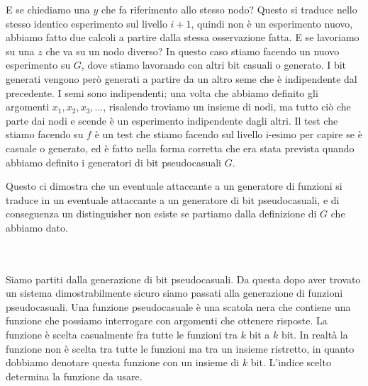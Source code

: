 E se chiediamo una $y$ che fa riferimento allo stesso nodo? Questo si traduce nello stesso identico esperimento sul livello $i+1$, quindi non è un esperimento nuovo, abbiamo fatto due calcoli a partire dalla stessa osservazione fatta. E se lavoriamo su una $z$ che va su un nodo diverso? In questo caso stiamo facendo un nuovo esperimento su $G$, dove stiamo lavorando con altri bit casuali o generato. I bit generati vengono però generati a partire da un altro seme che è indipendente dal precedente. I semi sono indipendenti; una volta che abbiamo definito gli argomenti $x_1, x_2, x_3, ...$, risalendo troviamo un insieme di nodi, ma tutto ciò che parte dai nodi e scende è un esperimento indipendente dagli altri. Il test che stiamo facendo su $f$ è un test che stiamo facendo sul livello i-esimo per capire se è casuale o generato, ed è fatto nella forma corretta che era stata prevista quando abbiamo definito i generatori di bit pseudocasuali $G$. 

Questo ci dimostra che un eventuale attaccante a un generatore di funzioni si traduce in un eventuale attaccante a un generatore di bit pseudocasuali, e di conseguenza un distinguisher non esiste se partiamo dalla definizione di $G$ che abbiamo dato.

\noindent{}

\\\\



Siamo partiti dalla generazione di bit pseudocasuali. Da questa dopo aver trovato un sistema dimostrabilmente sicuro siamo passati alla generazione di funzioni pseudocasuali. Una funzione pseudocasuale è una scatola nera che contiene una funzione che possiamo interrogare con argomenti che ottenere risposte. La funzione è scelta casualmente fra tutte le funzioni tra $k$ bit a $k$ bit. In realtà la funzione non è scelta tra tutte le funzioni ma tra un insieme ristretto, in quanto dobbiamo denotare questa funzione con un insieme di $k$ bit. L'indice scelto determina la funzione da usare.  


